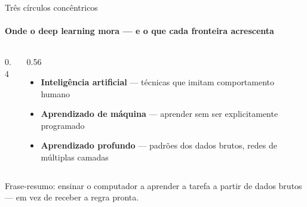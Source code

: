 \documentclass[aspectratio=169, 11pt]{beamer}
\begin{document}
\begin{frame}{Três círculos concêntricos}
  \framesubtitle{Onde o deep learning mora — e o que cada fronteira acrescenta}

  \begin{columns}[T]
    \begin{column}{0.4\textwidth}
      \begin{center}
      \end{center}
    \end{column}
    \begin{column}{0.56\textwidth}
      \begin{itemize}\setlength{\itemsep}{0.35ex}
        \item {\color{icNeural}\textbf{Inteligência artificial}} — técnicas que
              imitam comportamento humano
        \item {\color{icAzulClaro}\textbf{Aprendizado de máquina}} — aprender
              sem ser explicitamente programado
        \item {\color{icMagenta}\textbf{Aprendizado profundo}} — padrões dos
              dados brutos, redes de múltiplas camadas
      \end{itemize}
    \end{column}
  \end{columns}

  \begin{ideiabox}
    Frase-resumo: ensinar o computador a aprender a tarefa a partir de dados
    brutos — em vez de receber a regra pronta.
  \end{ideiabox}
\end{frame}
\end{document}
